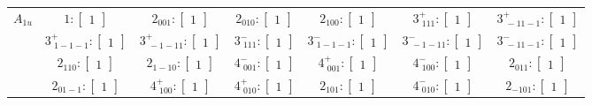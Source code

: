 \documentclass[fleqn,8pt,landscape]{jsarticle}
\begin{document}
\begin{longtable}{ccccccc}
$ A_{1u} $ & $ 1:\begin{bmatrix} 1 \end{bmatrix} $ & $ 2{}_{001}:\begin{bmatrix} 1 \end{bmatrix} $ & $ 2{}_{010}:\begin{bmatrix} 1 \end{bmatrix} $ & $ 2{}_{100}:\begin{bmatrix} 1 \end{bmatrix} $ & $ 3^{+}_{\,\,111}:\begin{bmatrix} 1 \end{bmatrix} $ & $ 3^{+}_{\,\,-11-1}:\begin{bmatrix} 1 \end{bmatrix} $ \\
& $ 3^{+}_{\,\,1-1-1}:\begin{bmatrix} 1 \end{bmatrix} $ & $ 3^{+}_{\,\,-1-11}:\begin{bmatrix} 1 \end{bmatrix} $ & $ 3^{-}_{\,\,111}:\begin{bmatrix} 1 \end{bmatrix} $ & $ 3^{-}_{\,\,1-1-1}:\begin{bmatrix} 1 \end{bmatrix} $ & $ 3^{-}_{\,\,-1-11}:\begin{bmatrix} 1 \end{bmatrix} $ & $ 3^{-}_{\,\,-11-1}:\begin{bmatrix} 1 \end{bmatrix} $ \\
& $ 2{}_{110}:\begin{bmatrix} 1 \end{bmatrix} $ & $ 2{}_{1-10}:\begin{bmatrix} 1 \end{bmatrix} $ & $ 4^{-}_{\,\,001}:\begin{bmatrix} 1 \end{bmatrix} $ & $ 4^{+}_{\,\,001}:\begin{bmatrix} 1 \end{bmatrix} $ & $ 4^{-}_{\,\,100}:\begin{bmatrix} 1 \end{bmatrix} $ & $ 2{}_{011}:\begin{bmatrix} 1 \end{bmatrix} $ \\
& $ 2{}_{01-1}:\begin{bmatrix} 1 \end{bmatrix} $ & $ 4^{+}_{\,\,100}:\begin{bmatrix} 1 \end{bmatrix} $ & $ 4^{+}_{\,\,010}:\begin{bmatrix} 1 \end{bmatrix} $ & $ 2{}_{101}:\begin{bmatrix} 1 \end{bmatrix} $ & $ 4^{-}_{\,\,010}:\begin{bmatrix} 1 \end{bmatrix} $ & $ 2{}_{-101}:\begin{bmatrix} 1 \end{bmatrix} $ \\

\end{longtable}
\end{document}
